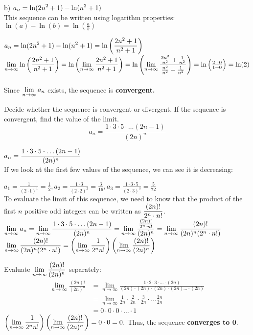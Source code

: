 \documentclass[12pt]{article}
\newcommand{\inftylim}[1]{\mathlarger{\lim_{n \to \infty}#1}}
\newcommand{\smallinftylim}[1]{\lim\limits_{n \to \infty} #1}
\begin{document}
\begin{solution}
b) $a_n = \mathlarger{\ln(2n^{2} + 1) - \ln(n^{2} + 1)}$  ~\\

This sequence can be written using logarithm properties: $\ln(a) - \ln(b) = \ln(\frac{a}{b}) $

$a_n =  \mathlarger{\ln(2n^{2} + 1) - \ln(n^{2} + 1)} = \mathlarger{\ln\left(\frac{2n^{2} + 1}{n^{2} + 1}\right)}$ ~\\

$\inftylim{\ln\left(\frac{2n^{2} + 1}{n^{2} + 1}\right)} = \ln\left(\inftylim{\frac{2n^{2} + 1}{n^{2} + 1}}\right) 
= \ln \left(\inftylim{\frac{
				\frac{2n^{2}}{n^2} + \frac{1}{n^2}}
				{
				\frac{n^{2}}{n^2} + \frac{1}{n^2}}
			}\right) = \ln \left(\frac{2 + 0}{1 + 0}\right) = \ln(2) $ ~\\

Since $\inftylim{a_n}$ exists, the sequence is \textbf{convergent.}
\end{solution}
Decide whether the sequence is convergent or divergent. If the sequence is convergent, find the value of the limit.
$$ a_n = \frac{1 \cdot 3 \cdot 5 \cdot \dots (2n - 1)}{(2n)^{n}}$$
\begin{solution}
$\mathlarger{a_n = \frac{1 \cdot 3 \cdot 5 \cdot \dots (2n - 1)}{(2n)^{n}}}$ ~\\

If we look at the first few values of the sequence, we can see it is decreasing: 

$a_1 = \frac{1}{(2 \cdot 1)^{1}} = \frac{1}{2}, a_2 = \frac{1 \cdot 3}{(2 \cdot 2)^{2}} = \frac{3}{16}, a_3 = \frac{1 \cdot 3 \cdot 5}{(2 \cdot 3)^{3}} = \frac{5}{72}$ ~\\

To evaluate the limit of this sequence, we need to know that the product of the first $n$ positive odd integers can be written as $\mathlarger{\frac{(2n)!}{2^{n} \cdot {n!}}}$. ~\\

$\inftylim{a_n} = \inftylim{\frac{1 \cdot 3 \cdot 5 \cdot \dots (2n - 1)}{(2n)^{n}}} = \inftylim{ \frac{\frac{(2n)!}{2^{n} \cdot {n!}}}{(2n)^{n}}} = \inftylim{{\frac{(2n)!}{(2n)^{n} (2^{n} \cdot n!)}}}$ ~\\

$\inftylim{{\frac{(2n)!}{(2n)^{n} (2^{n} \cdot n!)}}} = \left(\inftylim{\frac{1}{2^{n} n!}}\right)\left(\inftylim{\frac{(2n)!}{(2n)^{n}}}\right) $


Evaluate $\inftylim{\frac{(2n)!}{(2n)^{n}}}$ separately:
\begin{align*}
\smallinftylim{\frac{(2n)!}{(2n)^{n}}} &= \smallinftylim{\frac{1 \cdot 2 \cdot 3 \cdot ... \cdot (2n)}{(2n) \cdot (2n) \cdot (2n) \cdot (2n) \dots \cdot(2n)} } \\
&= \smallinftylim{\frac{1}{2n} \cdot \frac{2}{2n} \cdot \frac{3}{2n} \cdot \dots \frac{2n}{2n}}  \\
&= 0 \cdot 0 \cdot 0 \cdot \dots \cdot 1
\end{align*}
$ \left(\inftylim{\frac{1}{2^{n} n!}}\right)\left(\inftylim{\frac{(2n)!}{(2n)^{n}}}\right) = 0 \cdot 0 = 0.$ Thus, the sequence \textbf{converges to 0}.
\end{solution} 
\end{document}
